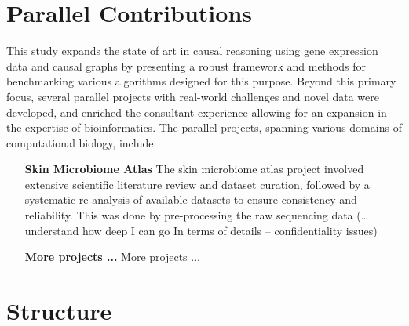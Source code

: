 \section{Parallel Contributions} %
\label{sec:parallel_contributions}

This study expands the state of art in causal reasoning using gene expression data and causal graphs by presenting a robust framework and methods for benchmarking various algorithms designed for this purpose. Beyond this primary focus, several parallel projects with real-world challenges and novel data were developed, and enriched the consultant experience allowing for an expansion in the expertise of bioinformatics. The parallel projects, spanning various domains of computational biology, include:

\begin{enumerate}
\item[\textbf{Skin Microbiome Atlas}] The skin microbiome atlas project involved extensive scientific literature review and dataset curation, followed by a systematic re-analysis of available datasets to ensure consistency and reliability. This was done by pre-processing the raw sequencing data (…understand how deep I can go In terms of details – confidentiality issues)
\item[\textbf{More projects ...}] More projects ...
\end{enumerate}

\section{Structure} %
\label{sec:structure}


